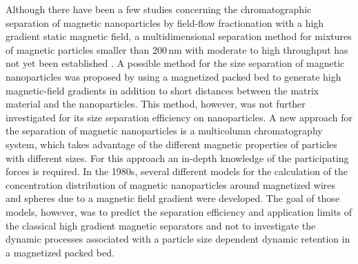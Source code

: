 
Although there have been a few studies concerning the chromatographic separation of magnetic nanoparticles by field-flow fractionation with a high gradient static magnetic field, a multidimensional separation method for mixtures of magnetic particles smaller than 200\,nm with moderate to high throughput has not yet been established \cite{kim2007development,williams2009magnetic,williams2010characterization}. A possible method for the size separation of magnetic nanoparticles was proposed by \cite{nomizu1996magnetic} using a magnetized packed bed to generate high magnetic-field gradients in addition to short distances between the matrix material and the nanoparticles. This method, however, was not further investigated for its size separation efficiency on nanoparticles. A new approach for the separation of magnetic nanoparticles is a multicolumn chromatography system, which takes advantage of the different magnetic properties of particles with different sizes. For this approach an in-depth knowledge of the participating forces is required.    
In the 1980s, several different models for the calculation of the concentration distribution of magnetic nanoparticles around magnetized wires \cite{gerber1984magnetic,davies19902,fletcher1991fine} and spheres \cite{moyer1986filtration} due to a magnetic field gradient were developed. The goal of those models, however, was to predict the separation efficiency and application limits of the classical high gradient magnetic separators and not to investigate the dynamic processes associated with a particle size dependent dynamic retention in a magnetized packed bed.

